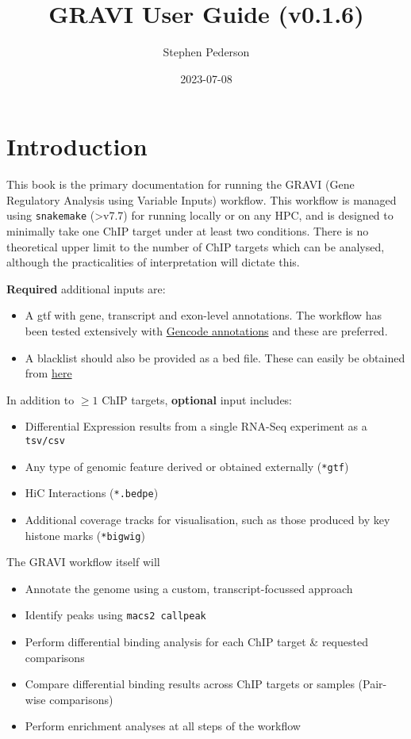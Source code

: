 \documentclass[
]{book}
\title{GRAVI User Guide (v0.1.6)}
\author{Stephen Pederson}
\date{2023-07-08}
\providecommand{\tightlist}{%
  \setlength{\itemsep}{0pt}\setlength{\parskip}{0pt}}
\begin{document}
\maketitle

{
\setcounter{tocdepth}{1}
\tableofcontents
}
\hypertarget{introduction}{%
\chapter{Introduction}\label{introduction}}

This book is the primary documentation for running the GRAVI (Gene Regulatory Analysis using Variable Inputs) workflow.
This workflow is managed using \texttt{snakemake} (\textgreater v7.7) for running locally or on any HPC, and is designed to minimally take one ChIP target under at least two conditions.
There is no theoretical upper limit to the number of ChIP targets which can be analysed, although the practicalities of interpretation will dictate this.

\textbf{Required} additional inputs are:

\begin{itemize}
\tightlist
\item
  A gtf with gene, transcript and exon-level annotations. The workflow has been tested extensively with \href{https://www.gencodegenes.org/}{Gencode annotations} and these are preferred.
\item
  A blacklist should also be provided as a bed file. These can easily be obtained from \href{https://github.com/Boyle-Lab/Blacklist/tree/master/lists}{here}
\end{itemize}

In addition to \(\geq 1\) ChIP targets, \textbf{optional} input includes:

\begin{itemize}
\tightlist
\item
  Differential Expression results from a single RNA-Seq experiment as a \texttt{tsv/csv}
\item
  Any type of genomic feature derived or obtained externally (\texttt{*gtf})
\item
  HiC Interactions (\texttt{*.bedpe})
\item
  Additional coverage tracks for visualisation, such as those produced by key histone marks (\texttt{*bigwig})
\end{itemize}

The GRAVI workflow itself will

\begin{itemize}
\tightlist
\item
  Annotate the genome using a custom, transcript-focussed approach
\item
  Identify peaks using \texttt{macs2\ callpeak}
\item
  Perform differential binding analysis for each ChIP target \& requested comparisons
\item
  Compare differential binding results across ChIP targets or samples (Pair-wise comparisons)
\item
  Perform enrichment analyses at all steps of the workflow
\end{itemize}
\end{document}
